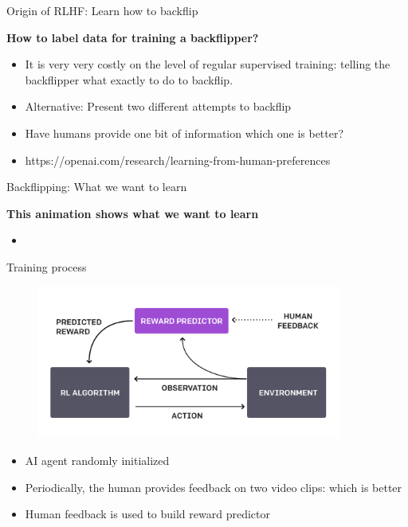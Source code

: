 \begin{vbframe}{Origin of RLHF: Learn how to backflip}

\vfill

\textbf{How to label data for training a backflipper?}

	\begin{itemize}
		\item It is very very costly on the level of
		regular supervised training: telling the
		backflipper what exactly to do to backflip.
                \item Alternative: Present two different
		attempts to backflip
                \item Have humans provide one bit of
		information which one is better?
\item https://openai.com/research/learning-from-human-preferences
	\end{itemize}

\vfill

\end{vbframe}


\begin{vbframe}{Backflipping: What we want to learn}

\vfill

\textbf{This animation shows what we want to learn}

	\begin{itemize}
		\item \href{https://images.openai.com/blob/cf6fdf49-ea9e-489d-a1f1-9753291cd09e/humanfeedbackjump.gif}{}

	\end{itemize}

\vfill

\end{vbframe}

\begin{vbframe}{Training process}

\vfill

\begin{figure}
\centering
\includegraphics[width = 10cm]{figure/trainingprocess.png}
\end{figure}

\begin{itemize}
	\item AI agent randomly initialized
	\item Periodically, the human provides feedback on
	two video clips: which is better
        \item Human feedback is used to build reward predictor
\end{itemize}

\vfill

\end{vbframe}


